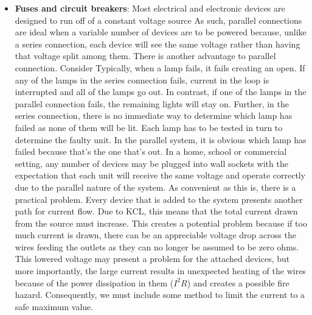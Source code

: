 \documentclass{report}
\begin{document}
\begin{itemize}
\begin{align*}
            .\end{align*}
            Similarly, for the current through $R_{2}$:
            \begin{align*}
                I_{R_{2}} = I_{T}\frac{R_{1}}{R_{1} + R_{2}}
            .\end{align*}
            Hence,
            \begin{align*}
                I_{X} = I_{T} \frac{R_{Y}}{R_{X} + R_{Y}}
            .\end{align*}
            This rule is convenient in that you don't have to compute the parallel equivalent resistance, but remember, it is valid only when there are just two resistors involved.
        \item \textbf{Fuses and circuit breakers}: Most electrical and electronic devices are designed to run off of a constant voltage source As such, parallel connections are ideal when a variable number of devices are to be powered because, unlike a series connection, each device will see the same voltage rather than having that voltage split among them.
            \bigbreak \noindent 
            There is another advantage to parallel connection. Consider
            \bigbreak \noindent 
            \bigbreak \noindent 
            Typically, when a lamp fails, it fails creating an open. If any of the lamps in the series connection fails, current in the loop is interrupted and all of the lamps go out. In contrast, if one of the lamps in the parallel connection fails, the remaining lights will stay on. Further, in the series connection, there is no immediate way to determine which lamp has failed as none of them will be lit. Each lamp has to be tested in turn to determine the faulty unit. In the parallel system, it is obvious which lamp has failed because that's the one that's out.
            \bigbreak \noindent 
            In a home, school or commercial setting, any number of devices may be plugged into wall sockets with the expectation that each unit will receive the same voltage and operate correctly due to the parallel nature of the system. As convenient as this is, there is a practical problem. Every device that is added to the system presents another path for current flow. Due to KCL, this means that the total current drawn from the source must increase. This creates a potential problem because if too much current is drawn, there can be an appreciable voltage drop across the wires feeding the outlets as they can no longer be assumed to be zero ohms. This lowered voltage may present a problem for the attached devices, but more importantly, the large current results in unexpected heating of the wires because of the power dissipation in them ($I^{2}R$) and creates a possible fire hazard. Consequently, we must include some method to limit the current to a safe maximum value.

\end{itemize}
\end{document}
